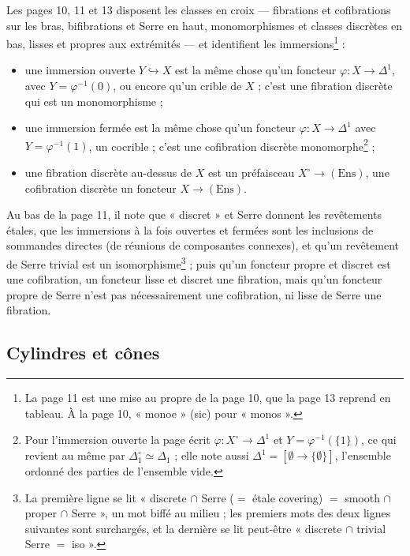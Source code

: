 \documentclass[11pt,a4paper]{article}
\begin{document}
Les pages 10, 11 et 13 disposent les classes en croix --- fibrations et
cofibrations sur les bras, bifibrations et Serre en haut, monomorphismes et
classes discrètes en bas, lisses et propres aux extrémités --- et identifient
les immersions\footnote{La page 11 est une mise au propre de la page 10, que
la page 13 reprend en tableau. À la page 10, « monoe » (sic) pour
« monos ».} :
\begin{itemize}
\item une immersion ouverte $Y \hookrightarrow X$ est la même chose qu'un
foncteur $\varphi : X \to \Delta^{1}$, avec $Y = \varphi^{-1}(0)$, ou encore
qu'un crible de $X$ ; c'est une fibration discrète qui est un monomorphisme ;
\item une immersion fermée est la même chose qu'un foncteur
$\varphi : X \to \Delta^{1}$ avec $Y = \varphi^{-1}(1)$, un cocrible ; c'est
une cofibration discrète monomorphe\footnote{Pour l'immersion ouverte la page
écrit $\varphi : X^{\circ} \to \Delta^{1}$ et $Y = \varphi^{-1}(\{1\})$, ce
qui revient au même par $\Delta_{1}^{\circ} \simeq \Delta_{1}$ ; elle note
aussi $\Delta^{1} = [\emptyset \to \{\emptyset\}]$, l'ensemble ordonné des
parties de l'ensemble vide.} ;
\item une fibration discrète au-dessus de $X$ est un préfaisceau
$X^{\circ} \to (\mathrm{Ens})$, une cofibration discrète un foncteur
$X \to (\mathrm{Ens})$.
\end{itemize}
Au bas de la page 11, il note que « discret » et Serre donnent les revêtements
étales, que les immersions à la fois ouvertes et fermées sont les inclusions de
sommandes directes (de réunions de composantes connexes), et qu'un revêtement
de Serre trivial est un isomorphisme\footnote{La première ligne se lit
« discrete $\cap$ Serre ($=$ étale covering) $=$ smooth $\cap$ proper
$\cap$ Serre », un mot biffé au milieu ; les premiers mots des deux lignes
suivantes sont surchargés, et la dernière se lit peut-être « discrete $\cap$
trivial Serre $=$ iso ».} ; puis qu'un foncteur propre et discret est une
cofibration, un foncteur lisse et discret une fibration, mais qu'un foncteur
propre de Serre n'est pas nécessairement une cofibration, ni lisse de Serre
une fibration.

\subsection*{Cylindres et cônes}
\end{document}
